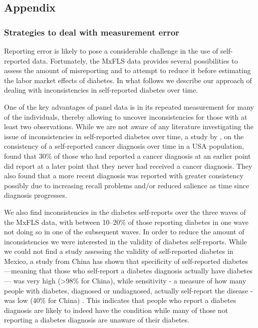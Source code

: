\documentclass[12pt,english]{article}
\begin{document}
\begin{appendix}
\clearpage


\part*{\label{part:Appendix}Appendix}

\section{\label{sec:Appendix}Strategies to deal with measurement error}

Reporting error is likely to pose a considerable challenge in the use of self-reported data. Fortunately, the \ac{MxFLS} data provides several possibilities to assess the amount of misreporting and to attempt to reduce it before estimating the labor market effects of diabetes. In what follows we describe our approach of dealing with inconsistencies in self-reported diabetes over time.

One of the key advantages of panel data is in its repeated measurement for many of the individuals, thereby allowing to uncover inconsistencies for those with at least two observations. While we are not aware of any literature investigating the issue of inconsistencies in self-reported diabetes over time, a study by \textcite{Zajacova2010}, on the consistency of a self-reported cancer diagnosis over time in a USA population, found that 30\% of those who had reported a cancer diagnosis at an earlier point did report at a later point that they never had received a cancer diagnosis. They also found that a more recent diagnosis was reported with greater consistency possibly due to increasing recall problems and/or reduced salience as time since diagnosis progresses.

We also find inconsistencies in the diabetes self-reports over the three waves of the \ac{MxFLS} data, with between 10--20\% of those reporting diabetes in one wave not doing so in one of the subsequent waves. In order to reduce the amount of inconsistencies we were interested in the validity of diabetes self-reports. While we could not find a study assessing the validity of self-reported diabetes in Mexico, a study from China has shown that specificity of self-reported diabetes ---meaning that those who self-report a diabetes diagnosis actually have diabetes--- was very high (>98\% for China), while sensitivity - a measure
of how many people with diabetes, diagnosed or undiagnosed, actually self-report the disease - was low (40\% for China) \parencite{Yuan2015}. This indicates that people who report a diabetes diagnosis are likely to indeed have the condition while many of those not reporting a diabetes diagnosis are unaware of their diabetes.


\end{appendix}
\end{document}
